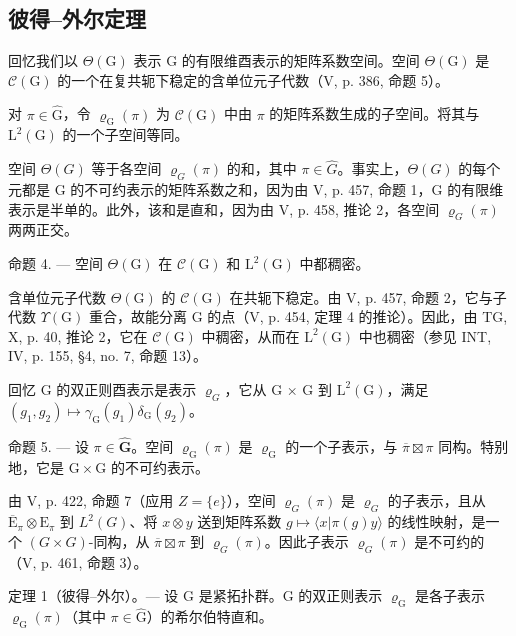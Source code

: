 \subsection{彼得--外尔定理}

回忆我们以 \(\Theta(\mathrm{G})\) 表示 G 的有限维酉表示的矩阵系数空间。空间 \(\Theta(\mathrm{G})\) 是 \(\mathcal{C}(\mathrm{G})\) 的一个在复共轭下稳定的含单位元子代数（V, p. 386, 命题 5）。

对 \(\pi \in \widehat{\mathrm{G}}\)，令 \(\varrho_{\mathrm{G}}(\pi)\) 为 \(\mathcal{C}(\mathrm{G})\) 中由 \(\pi\) 的矩阵系数生成的子空间。将其与 \(\mathrm{L}^2 (\mathrm{G})\) 的一个子空间等同。

空间 \(\Theta(G)\) 等于各空间 \(\varrho_{G}(\pi)\) 的和，其中 \(\pi\in\widehat{G}\)。事实上，\(\Theta(G)\) 的每个元都是 G 的不可约表示的矩阵系数之和，因为由 V, p. 457, 命题 1，G 的有限维表示是半单的。此外，该和是直和，因为由 V, p. 458, 推论 2，各空间 \(\varrho_{G}(\pi)\) 两两正交。

命题 4. — 空间 \(\Theta(\mathrm{G})\) 在 \(\mathcal{C}(\mathrm{G})\) 和 \(\mathrm{L}^2(\mathrm{G})\) 中都稠密。

含单位元子代数 \(\Theta(\mathrm{G})\) 的 \(\mathcal{C}(\mathrm{G})\) 在共轭下稳定。由 V, p. 457, 命题 2，它与子代数 \(\Upsilon(\mathrm{G})\) 重合，故能分离 G 的点（V, p. 454, 定理 4 的推论）。因此，由 TG, X, p. 40, 推论 2，它在 \(\mathcal{C}(\mathrm{G})\) 中稠密，从而在 \(\mathrm{L}^2(\mathrm{G})\) 中也稠密（参见 INT, IV, p. 155, §4, no. 7, 命题 13）。

回忆 G 的双正则酉表示是表示 \(\varrho_{G}\)，它从 G × G 到 \(\mathrm{L}^{2}(\mathrm{G})\)，满足 \((g_{1}, g_{2}) \mapsto \gamma_{\mathrm{G}}(g_{1}) \delta_{\mathrm{G}}(g_{2})\)。

命题 5. --- 设 \(\pi \in \widehat{\mathbf{G}}\)。空间 \(\varrho_{\mathrm{G}}(\pi)\) 是 \(\varrho_{\mathrm{G}}\) 的一个子表示，与 \(\overline{\pi} \boxtimes \pi\) 同构。特别地，它是 \(\mathrm{G} \times \mathrm{G}\) 的不可约表示。

由 V, p. 422, 命题 7（应用 \(Z = \{e\}\)），空间 \(\varrho_{G}(\pi)\) 是 \(\varrho_{G}\) 的子表示，且从 \(\overline{\mathrm{E}}_{\pi} \otimes \mathrm{E}_{\pi}\) 到 \(L^2(G)\)、将 \(x \otimes y\) 送到矩阵系数 \(g \mapsto \langle x | \pi(g)y \rangle\) 的线性映射，是一个 \((G \times G)\)-同构，从 \(\overline{\pi} \boxtimes \pi\) 到 \(\varrho_{G}(\pi)\)。因此子表示 \(\varrho_{G}(\pi)\) 是不可约的（V, p. 461, 命题 3）。

定理 1（彼得--外尔）。--- 设 G 是紧拓扑群。G 的双正则表示 \(\varrho_{\mathrm{G}}\) 是各子表示 \(\varrho_{\mathrm{G}}(\pi)\)（其中 \(\pi \in \widehat{\mathrm{G}}\)）的希尔伯特直和。

